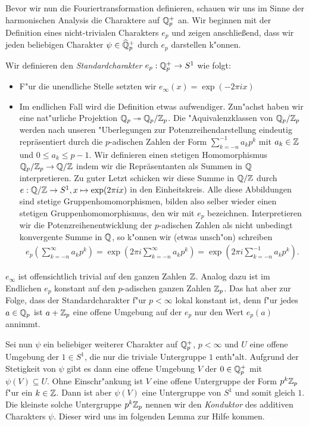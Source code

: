 		
		Bevor wir nun die Fouriertransformation definieren, schauen wir uns im Sinne der harmonischen Analysis die Charaktere auf $\mathbb{Q}_p^+$ an.
		Wir beginnen mit der Definition eines nicht-trivialen Charakters $e_p$ und zeigen anschließend, dass wir jeden beliebigen Charakter $\psi \in \widehat{\mathbb{Q}}_p^+$ durch $e_p$ darstellen k"onnen.
		\begin{defi}
			Wir definieren den \emph{Standardcharakter} $e_p:\mathbb{Q}_p^+ \to S^1$ wie folgt:
			\begin{itemize}%
				\item F"ur die unendliche Stelle setzten wir $e_\infty(x) = \exp(-2\pi i x)$
				\item Im endlichen Fall wird die Definition etwas aufwendiger. Zun"achst haben wir eine nat"urliche Projektion ${\mathbb{Q}_p} \twoheadrightarrow {\mathbb{Q}_p}/{\mathbb{Z}_p}$.
				Die "Aquivalenzklassen von ${\mathbb{Q}_p}/{\mathbb{Z}_p}$ werden nach unseren "Uberlegungen zur Potenzreihendarstellung eindeutig repräsentiert durch die $p$-adischen Zahlen der Form $\sum_{k=-n}^{-1} a_kp^k$ mit $a_k \in \mathbb{Z}$ und $0\leq a_k\leq p-1$.
				Wir definieren einen stetigen Homomorphismus ${\mathbb{Q}_p}/{\mathbb{Z}_p} \to \mathbb{Q}/\mathbb{Z}$ indem wir die Repräsentanten als Summen in $\mathbb{Q}$ interpretieren. 
				Zu guter Letzt schicken wir diese Summe in $\mathbb{Q}/\mathbb{Z}$ durch $e: \mathbb{Q}/\mathbb{Z} \to S^1, x \mapsto \exp(2\pi i x)$ in den Einheitskreis. 
				Alle diese Abbildungen sind stetige Gruppenhomomorphismen, bilden also selber wieder einen stetigen Gruppenhomomorphismus, den wir mit $e_p$ bezeichnen.
				Interpretieren wir die Potenzreihenentwicklung der $p$-adischen Zahlen als nicht unbedingt konvergente Summe in $\mathbb{Q}$, so k"onnen wir (etwas unsch"on) schreiben
				\begin{align*}
					e_p\left(\sum_{k=-n}^{\infty} a_kp^k\right) = \exp\left(2\pi i \sum_{k=-n}^{\infty} a_kp^k\right) = \exp\left(2\pi i \sum_{k=-n}^{-1} a_kp^k\right).
				\end{align*}
			\end{itemize}
		\end{defi}
		$e_\infty$ ist offensichtlich trivial auf den ganzen Zahlen $\mathbb{Z}$.
		Analog dazu ist im Endlichen $e_p$ konstant auf den $p$-adischen ganzen Zahlen ${\mathbb{Z}_p}$.
		Das hat aber zur Folge, dass der Standardcharakter f"ur $p<\infty$ lokal konstant ist, denn f"ur jedes $a \in {\mathbb{Q}_p}$ ist $a+{\mathbb{Z}_p}$ eine offene Umgebung auf der $e_p$ nur den Wert $e_p(a)$ annimmt.
		
		Sei nun $\psi$ ein beliebiger weiterer Charakter auf $\mathbb{Q}_p^+$, $p<\infty$ und $U$ eine offene Umgebung der $1 \in S^1$, die nur die triviale Untergruppe $1$ enth"alt. 
		Aufgrund der Stetigkeit von $\psi$ gibt es dann eine offene Umgebung $V$ der $0\in\mathbb{Q}_p^+$ mit $\psi(V)\subseteq U$. 
		Ohne Einschr"ankung ist $V$ eine offene Untergruppe der Form $p^k{\mathbb{Z}_p}$ f"ur ein $k\in\mathbb{Z}$. 
		Dann ist aber $\psi(V)$ eine Untergruppe von $S^1$ und somit gleich $1$.
		Die kleinste solche Untergruppe $p^k{\mathbb{Z}_p}$ nennen wir den \emph{Konduktor} des additiven Charakters $\psi$. %
		Dieser wird uns im folgenden Lemma zur Hilfe kommen.
	

